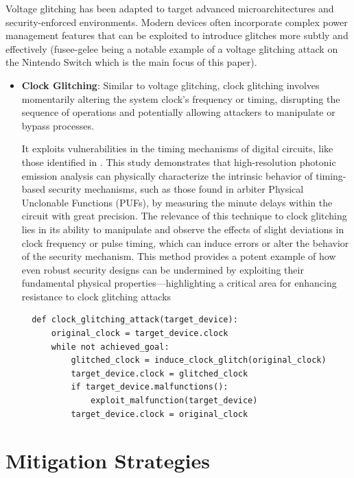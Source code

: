 \begin{itemize}
Voltage glitching has been adapted to target advanced microarchitectures and security-enforced environments. Modern devices often incorporate complex power management features that can be exploited to introduce glitches more subtly and effectively
(fusee-gelee being a notable example of a voltage glitching attack on the Nintendo Switch which is the main focus of this paper).\\
\end{itemize}

\begin{itemize}
\item
  \textbf{Clock Glitching}: Similar to voltage glitching, clock
  glitching involves momentarily altering the system clock's frequency or timing, disrupting the sequence of
operations and potentially allowing attackers to manipulate or bypass
processes.

It exploits vulnerabilities in the timing mechanisms of digital circuits, like those identified in \cite{tajikPhysicalCharacterizationArbiter2014}. This study demonstrates that high-resolution photonic emission analysis can physically characterize the intrinsic behavior of timing-based security mechanisms, such as those found in arbiter Physical Unclonable Functions (PUFs), by measuring the minute delays within the circuit with great precision. The relevance of this technique to clock glitching lies in its ability to manipulate and observe the effects of slight deviations in clock frequency or pulse timing, which can induce errors or alter the behavior of the security mechanism. This method provides a potent example of how even robust security designs can be undermined by exploiting their fundamental physical properties—highlighting a critical area for enhancing resistance to clock glitching attacks

\begin{verbatim}
  def clock_glitching_attack(target_device):
      original_clock = target_device.clock
      while not achieved_goal:
          glitched_clock = induce_clock_glitch(original_clock)
          target_device.clock = glitched_clock
          if target_device.malfunctions():
              exploit_malfunction(target_device)
          target_device.clock = original_clock 
  \end{verbatim}

\end{itemize}

\hypertarget{mitigation-strategies}{%
\section{Mitigation Strategies}\label{mitigation-strategies}}

